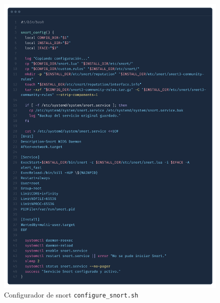 \documentclass[11pt,a4paper,twoside]{report}
\begin{document}
\begin{figure}[H]
	\centering
	\includegraphics[scale=0.12]{script_automatico/8.png}
	\caption{Configurador de snort \texttt{configure\_snort.sh}}
	\label{fig:configure-snort}
\end{figure}
\end{document}
